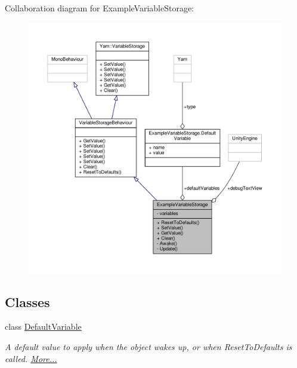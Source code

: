 Collaboration diagram for Example\-Variable\-Storage\-:
\nopagebreak
\begin{figure}[H]
\begin{center}
\leavevmode
\includegraphics[width=350pt]{a00371}
\end{center}
\end{figure}
\subsection*{Classes}
\begin{DoxyCompactItemize}
\item 
class \hyperlink{a00087_a00351}{Default\-Variable}
\begin{DoxyCompactList}\small\item\em A default value to apply when the object wakes up, or when Reset\-To\-Defaults is called.  \hyperlink{a00087_a00351}{More...}\end{DoxyCompactList}\end{DoxyCompactItemize}
